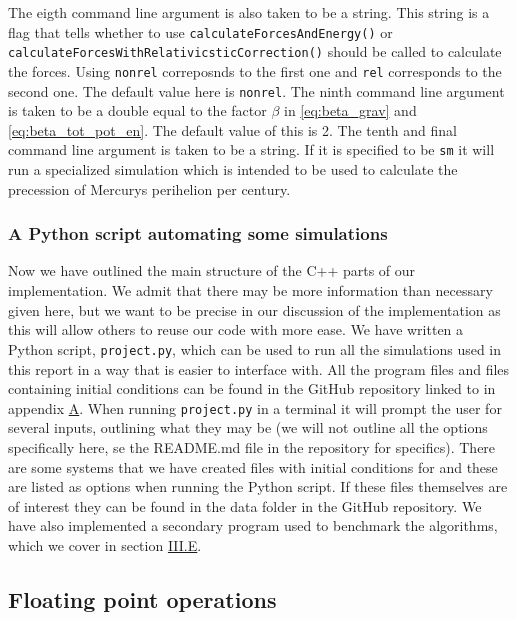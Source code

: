 \documentclass[reprint,english,notitlepage]{revtex4-1}  %
\begin{document}
The eigth command line argument is also taken to be a string. This string is a flag that tells whether to use \verb+calculateForcesAndEnergy()+ or \verb+calculateForcesWithRelativicsticCorrection()+ should be called to calculate the forces. Using \verb+nonrel+ correposnds to the first one and \verb+rel+ corresponds to the second one. The default value here is \verb+nonrel+. The ninth command line argument is taken to be a double equal to the factor $\beta$ in \eqref{eq:beta_grav} and \eqref{eq:beta_tot_pot_en}. The default value of this is 2. The tenth and final command line argument is taken to be a string. If it is specified to be \verb+sm+ it will run a specialized simulation which is intended to be used to calculate the precession of Mercurys perihelion per century. 


\subsubsection{A Python script automating some simulations} \label{sec:III:a:5}

Now we have outlined the main structure of the C++ parts of our implementation. We admit that there may be more information than necessary given here, but we want to be precise in our discussion of the implementation as this will allow others to reuse our code with more ease. We have written a Python script, \verb+project.py+, which can be used to run all the simulations used in this report in a way that is easier to interface with. All the program files and files containing initial conditions can be found in the GitHub repository linked to in appendix \hyperref[A]{A}. When running \verb+project.py+ in a terminal it will prompt the user for several inputs, outlining what they may be (we will not outline all the options specifically here, se the README.md file in the repository for specifics). There are some systems that we have created files with initial conditions for and these are listed as options when running the Python script. If these files themselves are of interest they can be found in the data folder in the GitHub repository. We have also implemented a secondary program used to benchmark the algorithms, which we cover in section \hyperref[sec:III:e]{III.E}.

\subsection{Floating point operations} \label{sec:III:b}
\end{document}
